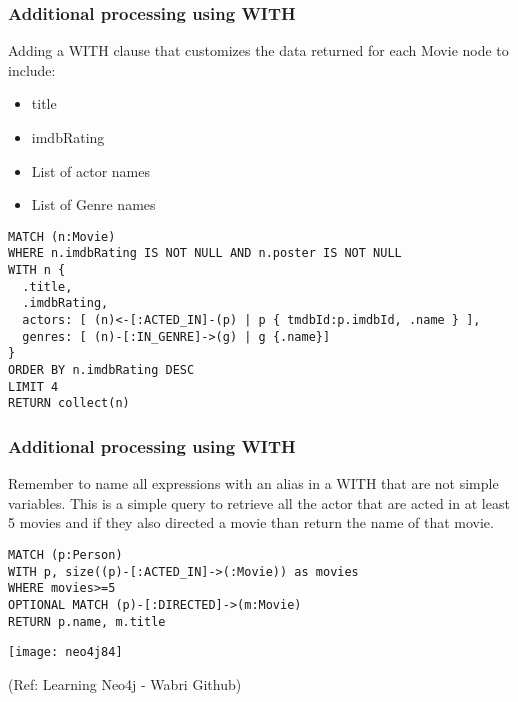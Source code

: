 \begin{frame}[fragile]\frametitle{Additional processing using WITH}

Adding a WITH clause that customizes the data returned for each Movie node to include:
\begin{itemize}
\item title
\item imdbRating
\item List of actor names
\item List of Genre names
\end{itemize}

\begin{lstlisting}
MATCH (n:Movie)
WHERE n.imdbRating IS NOT NULL AND n.poster IS NOT NULL
WITH n {
  .title,
  .imdbRating,
  actors: [ (n)<-[:ACTED_IN]-(p) | p { tmdbId:p.imdbId, .name } ],
  genres: [ (n)-[:IN_GENRE]->(g) | g {.name}]
}
ORDER BY n.imdbRating DESC
LIMIT 4
RETURN collect(n)
\end{lstlisting}

\end{frame}

\begin{frame}[fragile]\frametitle{Additional processing using WITH}

Remember to name all expressions with an alias in a WITH that are not simple variables. This is a simple query to retrieve all the actor that are acted in at least 5 movies and if they also directed a movie than return the name of that movie.


\begin{lstlisting}
MATCH (p:Person)
WITH p, size((p)-[:ACTED_IN]->(:Movie)) as movies
WHERE movies>=5
OPTIONAL MATCH (p)-[:DIRECTED]->(m:Movie)
RETURN p.name, m.title

\end{lstlisting}


\begin{center}
\texttt{[image: neo4j84]}
\end{center}	


{\tiny (Ref: Learning Neo4j - Wabri Github)}
\end{frame}

